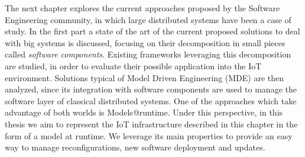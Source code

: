 The next chapter explores the current approaches proposed by the Software Engineering community, in which large distributed systems have been a case of study.
In the first part a state of the art of the current proposed solutions to deal with big systems is discussed, focusing on their decomposition in small pieces called \textit{software components}.
Existing frameworks leveraging this decomposition are studied, in order to evaluate their possible application into the IoT environment.
Solutions typical of Model Driven Engineering (MDE) are then analyzed, since its integration with software components are used to manage the software layer of classical distributed systems.
One of the approaches which take advantage of both worlds is Models@runtime\cite{morin2009mar}.
Under this perspective, in this thesis we aim to represent the IoT infrastructure described in this chapter in the form of a model at runtime.
We leverage its main properties to provide an easy way to manage reconfigurations, new software deployment and updates.





